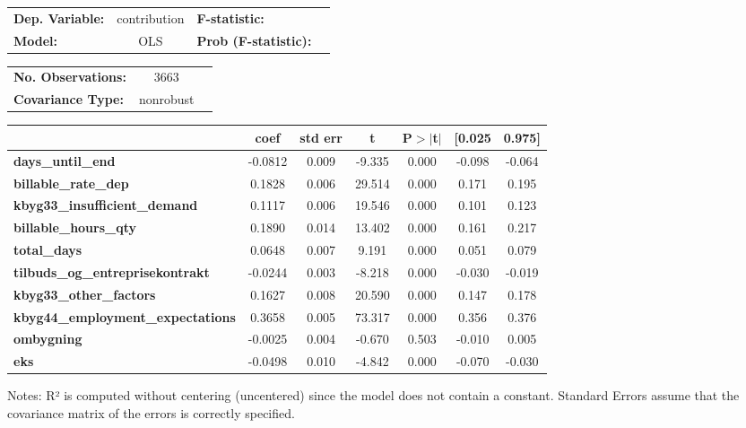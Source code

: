 \begin{center}
\begin{tabular}{lclc}
\centering \toprule
\textbf{Dep. Variable:}                   &  contribution & \textbf{  F-statistic:       }  \\
\textbf{Model:}                           &      OLS      & \textbf{  Prob (F-statistic):}  \\
\bottomrule
\end{tabular}
\begin{tabular}{lcl}
\textbf{No. Observations:}                &       3663    & \textbf{                     }  \\
\textbf{Covariance Type:}                 &   nonrobust   & \textbf{                     }  \\
\bottomrule
\end{tabular}
\begin{tabular}{lcccccc}
                                          & \textbf{coef} & \textbf{std err} & \textbf{t} & \textbf{P$> |$t$|$} & \textbf{[0.025} & \textbf{0.975]}  \\
\midrule
\textbf{days\_until\_end}                 &      -0.0812  &        0.009     &    -9.335  &         0.000        &       -0.098    &       -0.064     \\
\textbf{billable\_rate\_dep}              &       0.1828  &        0.006     &    29.514  &         0.000        &        0.171    &        0.195     \\
\textbf{kbyg33\_insufficient\_demand}     &       0.1117  &        0.006     &    19.546  &         0.000        &        0.101    &        0.123     \\
\textbf{billable\_hours\_qty}             &       0.1890  &        0.014     &    13.402  &         0.000        &        0.161    &        0.217     \\
\textbf{total\_days}                      &       0.0648  &        0.007     &     9.191  &         0.000        &        0.051    &        0.079     \\
\textbf{tilbuds\_og\_entreprisekontrakt}  &      -0.0244  &        0.003     &    -8.218  &         0.000        &       -0.030    &       -0.019     \\
\textbf{kbyg33\_other\_factors}           &       0.1627  &        0.008     &    20.590  &         0.000        &        0.147    &        0.178     \\
\textbf{kbyg44\_employment\_expectations} &       0.3658  &        0.005     &    73.317  &         0.000        &        0.356    &        0.376     \\
\textbf{ombygning}                        &      -0.0025  &        0.004     &    -0.670  &         0.503        &       -0.010    &        0.005     \\
\textbf{eks}                              &      -0.0498  &        0.010     &    -4.842  &         0.000        &       -0.070    &       -0.030     \\
\bottomrule
\end{tabular}
\end{center}

Notes: \newline
 [1] R² is computed without centering (uncentered) since the model does not contain a constant. \newline
 [2] Standard Errors assume that the covariance matrix of the errors is correctly specified.